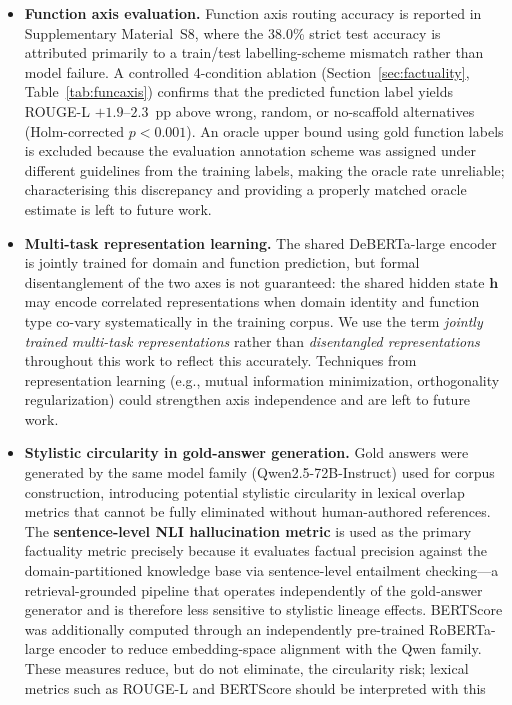 \documentclass[a4paper,fleql]{cas-sc}
\begin{document}
\begin{itemize}
\item \textbf{Function axis evaluation.} Function axis routing accuracy is reported
    in Supplementary Material~S8, where the 38.0\% strict test accuracy is attributed
    primarily to a train/test labelling-scheme mismatch rather than model failure.
    A controlled 4-condition ablation (Section~\ref{sec:factuality}, Table~\ref{tab:funcaxis})
    confirms that the predicted function label yields ROUGE-L $+1.9$--$2.3$~pp above
    wrong, random, or no-scaffold alternatives (Holm-corrected $p{<}0.001$).
    An oracle upper bound using gold function labels is excluded because the evaluation
    annotation scheme was assigned under different guidelines from the training labels,
    making the oracle rate unreliable; characterising this discrepancy and providing
    a properly matched oracle estimate is left to future work.
\item \textbf{Multi-task representation learning.}
The shared DeBERTa-large encoder is jointly trained for domain and function prediction,
but formal disentanglement of the two axes is not guaranteed: the shared hidden state
$\mathbf{h}$ may encode correlated representations when domain identity and function type
co-vary systematically in the training corpus. We use the term \emph{jointly trained multi-task
representations} rather than \emph{disentangled representations} throughout this work
to reflect this accurately. Techniques from representation learning (e.g., mutual information
minimization, orthogonality regularization) could strengthen axis independence and are
left to future work.
\item \textbf{Stylistic circularity in gold-answer generation.} Gold answers were generated by the same model family (Qwen2.5-72B-Instruct)
used for corpus construction, introducing potential stylistic circularity in
lexical overlap metrics that cannot be fully eliminated without human-authored
references.
The \textbf{sentence-level NLI hallucination metric} is used as the primary factuality metric precisely because
it evaluates factual precision against the domain-partitioned knowledge base
via sentence-level entailment checking---a retrieval-grounded pipeline that operates
independently of the gold-answer generator and is therefore less sensitive to
stylistic lineage effects.
BERTScore was additionally computed through an independently pre-trained
RoBERTa-large encoder to reduce embedding-space alignment with the Qwen family.
These measures reduce, but do not eliminate, the circularity risk; lexical
metrics such as ROUGE-L and BERTScore should be interpreted with this

\end{itemize}
\end{document}
